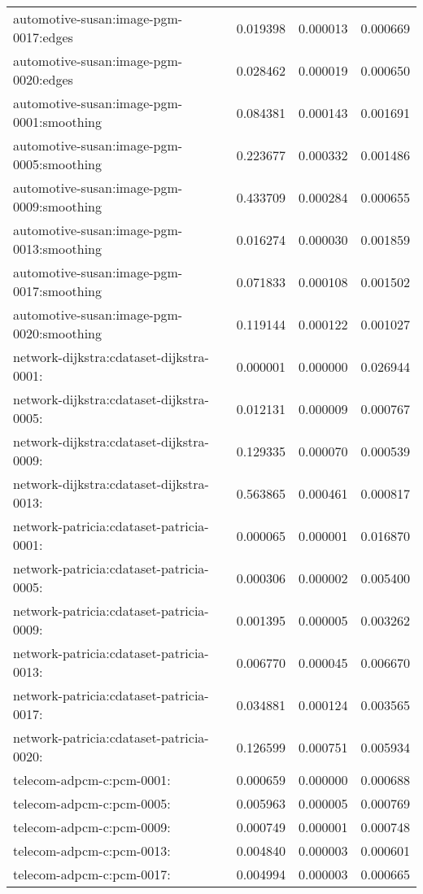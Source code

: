 \begin{longtable}{lrrr}
automotive-susan:image-pgm-0017:edges & 0.019398 & 0.000013 & 0.000669 \\
automotive-susan:image-pgm-0020:edges & 0.028462 & 0.000019 & 0.000650 \\
automotive-susan:image-pgm-0001:smoothing & 0.084381 & 0.000143 & 0.001691 \\
automotive-susan:image-pgm-0005:smoothing & 0.223677 & 0.000332 & 0.001486 \\
automotive-susan:image-pgm-0009:smoothing & 0.433709 & 0.000284 & 0.000655 \\
automotive-susan:image-pgm-0013:smoothing & 0.016274 & 0.000030 & 0.001859 \\
automotive-susan:image-pgm-0017:smoothing & 0.071833 & 0.000108 & 0.001502 \\
automotive-susan:image-pgm-0020:smoothing & 0.119144 & 0.000122 & 0.001027 \\
network-dijkstra:cdataset-dijkstra-0001: & 0.000001 & 0.000000 & 0.026944 \\
network-dijkstra:cdataset-dijkstra-0005: & 0.012131 & 0.000009 & 0.000767 \\
network-dijkstra:cdataset-dijkstra-0009: & 0.129335 & 0.000070 & 0.000539 \\
network-dijkstra:cdataset-dijkstra-0013: & 0.563865 & 0.000461 & 0.000817 \\
network-patricia:cdataset-patricia-0001: & 0.000065 & 0.000001 & 0.016870 \\
network-patricia:cdataset-patricia-0005: & 0.000306 & 0.000002 & 0.005400 \\
network-patricia:cdataset-patricia-0009: & 0.001395 & 0.000005 & 0.003262 \\
network-patricia:cdataset-patricia-0013: & 0.006770 & 0.000045 & 0.006670 \\
network-patricia:cdataset-patricia-0017: & 0.034881 & 0.000124 & 0.003565 \\
network-patricia:cdataset-patricia-0020: & 0.126599 & 0.000751 & 0.005934 \\
telecom-adpcm-c:pcm-0001: & 0.000659 & 0.000000 & 0.000688 \\
telecom-adpcm-c:pcm-0005: & 0.005963 & 0.000005 & 0.000769 \\
telecom-adpcm-c:pcm-0009: & 0.000749 & 0.000001 & 0.000748 \\
telecom-adpcm-c:pcm-0013: & 0.004840 & 0.000003 & 0.000601 \\
telecom-adpcm-c:pcm-0017: & 0.004994 & 0.000003 & 0.000665 \\

\end{longtable}
